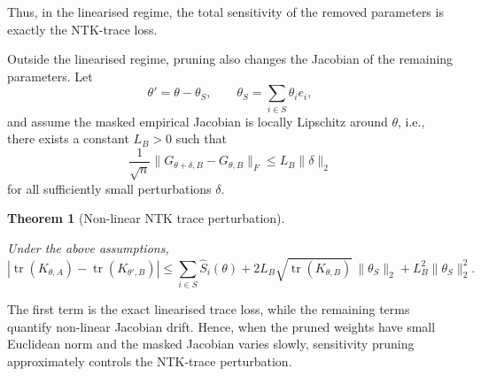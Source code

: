 \documentclass{article}
\newtheorem{theorem}{Theorem}
\theoremstyle{definition}
\theoremstyle{remark}
\begin{document}
Thus, in the linearised regime, the total sensitivity of the removed
parameters is exactly the NTK-trace loss.

Outside the linearised regime, pruning also changes the Jacobian of the
remaining parameters. Let
\[
\theta'
=
\theta-\theta_S,
\qquad
\theta_S
=
\sum_{i\in S}\theta_ie_i,
\]
and assume the masked empirical Jacobian is locally Lipschitz around $\theta$, i.e., there exists a constant $L_B > 0$ such that
\[
\frac1{\sqrt n}
\|G_{\theta+\delta,B}-G_{\theta,B}\|_F
\le
L_B\|\delta\|_2
\]
for all sufficiently small perturbations \(\delta\).

\begin{theorem}[Non-linear NTK trace perturbation]
\label{thm:ntk_trace_bound}

Under the above assumptions,
\[
\left|
\operatorname{tr}(K_{\theta,A})
-
\operatorname{tr}(K_{\theta',B})
\right|
\le
\sum_{i\in S}\widehat S_i(\theta)
+
2L_B
\sqrt{\operatorname{tr}(K_{\theta,B})}
\,\|\theta_S\|_2
+
L_B^2\|\theta_S\|_2^2 .
\]

\end{theorem}

The first term is the exact linearised trace loss, while the remaining terms quantify non-linear Jacobian drift. Hence, when the pruned weights have small Euclidean norm and the masked Jacobian varies slowly, sensitivity pruning approximately controls the NTK-trace perturbation.
\end{document}
